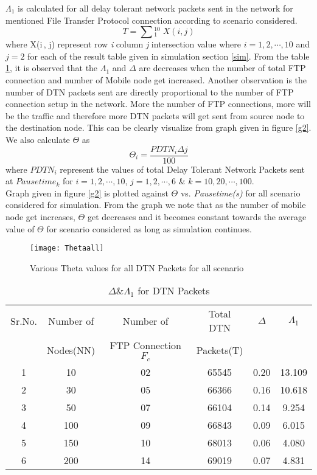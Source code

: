 \documentclass[3p,times]{elsarticle}
\begin{document}
$ \Lambda_1 $ is calculated for all delay tolerant network packets sent in the network for mentioned File Transfer Protocol connection according to scenario considered. 
\begin{equation}
T = \sum{_{1}^{10}} \; X(i,j)
\end{equation}
where X(i\,, j) represent row \emph{i} column \emph{j} intersection value where $ i= 1,2,\cdots, 10 $ and $ j=2 $ for each of the result table given in simulation section \ref{sim}.
From the table \ref{t15}, it is observed that the $\Lambda_1$ and $\Delta$  are decreases when the number of total FTP connection and number of Mobile node get increased. Another observation is the number of DTN packets sent are directly proportional to the number of FTP connection setup in the network. More the number of FTP connections, more will be the traffic and therefore more DTN packets will get sent from source node to the destination node. This can be clearly visualize from graph given in figure \ref{g2}. \\
We also calculate $ \Theta $ as 
\begin{equation}
\Theta_i =  \frac{PDTN_i  \Delta j }{100}
\end{equation}
where $PDTN_i$ represent the values of total Delay Tolerant Network Packets sent at $Pausetime_k$ for $ i=1,2,\cdots, 10 $, $ j=1,2, \cdots ,6$ \& $ k=10,20,\cdots ,100$. \\
Graph given in figure \ref{g2} is plotted against $\Theta$  vs. \emph{Pausetime(s)} for all scenario considered for simulation. From the graph we note that as the number of mobile node get increases, $\Theta$ get decreases and it becomes constant towards the average value of $\Theta$  for scenario considered as long as simulation continues. 
\begin{figure}[h]
\centering
\mbox{\texttt{[image: Thetaall]}}
\caption{Various Theta values for all DTN Packets for all scenario}
\label{g5}
\end{figure}

\begin{table}[t]
\centering
\caption{$ \Delta \& \Lambda_1 $ for DTN Packets }
\begin{tabular}{|c|c|c|c|c|c|}
\hline
Sr.No. & Number of  & Number of  & Total DTN  & $ \Delta $ & $ \Lambda_1 $ \\
 &  Nodes(NN) &  FTP Connection $F_c$ &  Packets(T) && \\
\hline
1 & 10 & 02 & 65545 & 0.20 & 13.109 \\
2 & 30 & 05 & 66366 & 0.16 & 10.618\\
3 & 50 & 07 & 66104 & 0.14 & 9.254 \\
4 & 100 & 09 & 66843 & 0.09 & 6.015 \\
5 & 150 & 10 & 68013 & 0.06 & 4.080 \\
6 & 200 & 14 & 69019 & 0.07 & 4.831 \\
\hline
\end{tabular}
\label{t15}
\end{table}
\end{document}
